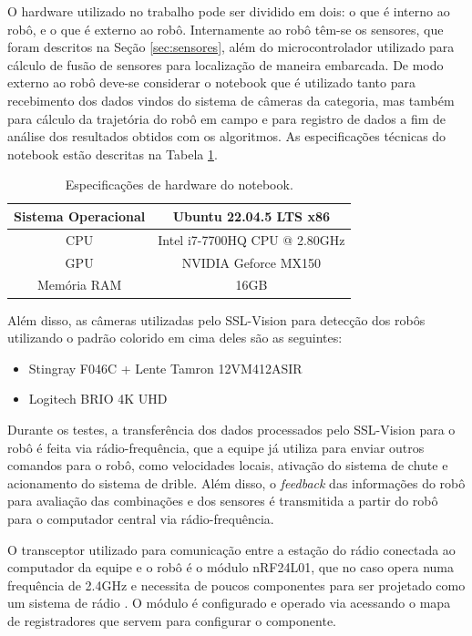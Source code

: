 \documentclass[acronym, symbols, table, deposito]{fei}
\begin{document}
		O hardware utilizado no trabalho pode ser dividido em dois: o que é interno ao robô, e o que é externo ao robô. Internamente ao robô têm-se os sensores, que foram descritos na Seção \ref{sec:sensores}, além do microcontrolador utilizado para cálculo de fusão de sensores para localização de maneira embarcada. De modo externo ao robô deve-se considerar o notebook que é utilizado tanto para recebimento dos dados vindos do sistema de câmeras da categoria, mas também para cálculo da trajetória do robô em campo e para registro de dados a fim de análise dos resultados obtidos com os algoritmos. As especificações técnicas do notebook estão descritas na Tabela \ref{tbl:especificacoes_notebook}.
		
		\begin{table}[!htb]
			\centering
			\caption{Especificações de hardware do notebook.}
			\label{tbl:especificacoes_notebook}
			\begin{tabular}{c c}
				\hline
				Sistema Operacional & Ubuntu 22.04.5 LTS x86\textunderscore64  \\ \hline
				CPU 				& Intel i7-7700HQ CPU @ 2.80GHz \\ \hline
				GPU 				& NVIDIA Geforce MX150 \\ \hline
				Memória RAM			& 16GB \\ \hline
			\end{tabular}
		\end{table}
	
		Além disso, as câmeras utilizadas pelo SSL-Vision para detecção dos robôs utilizando o padrão colorido em cima deles são as seguintes:
		
		\begin{itemize}
			\item Stingray F046C \cite{stingray_f046c} + Lente Tamron 12VM412ASIR
			\item Logitech BRIO 4K UHD \cite{logitech_brio}
		\end{itemize}
		
		Durante os testes, a transferência dos dados processados pelo SSL-Vision para o robô é feita via rádio-frequência, que a equipe já utiliza para enviar outros comandos para o robô, como velocidades locais, ativação do sistema de chute e acionamento do sistema de drible. Além disso, o \textit{feedback} das informações do robô para avaliação das combinações e dos sensores é transmitida a partir do robô para o computador central via rádio-frequência.
		
		O transceptor utilizado para comunicação entre a estação do rádio conectada ao computador da equipe e o robô é o módulo nRF24L01, que no caso opera numa frequência de 2.4GHz e necessita de poucos componentes para ser projetado como um sistema de rádio \cite{datasheet_nrf24}. O módulo é configurado e operado via  acessando o mapa de registradores que servem para configurar o componente.
		
\end{document}

